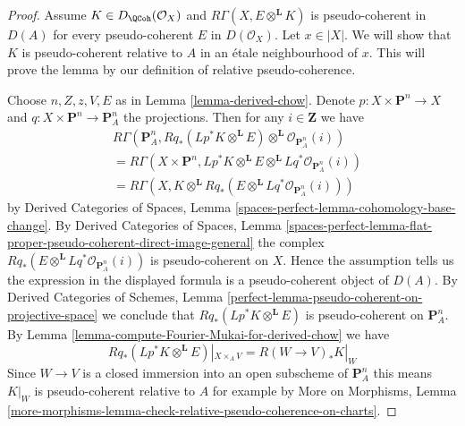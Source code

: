 \begin{proof}
Assume $K \in D_\QCoh(\mathcal{O}_X)$ and
$R\Gamma(X, E \otimes^\mathbf{L} K)$ is pseudo-coherent
in $D(A)$ for every pseudo-coherent $E$ in $D(\mathcal{O}_X)$.
Let $x \in |X|$. We will show that $K$ is pseudo-coherent relative to $A$
in an \'etale neighbourhood of $x$. This will prove the lemma
by our definition of relative pseudo-coherence.

\medskip\noindent
Choose $n, Z, z, V, E$ as in Lemma \ref{lemma-derived-chow}.
Denote $p : X \times \mathbf{P}^n \to X$ and
$q : X \times \mathbf{P}^n \to \mathbf{P}^n_A$
the projections.
Then for any $i \in \mathbf{Z}$ we have
\begin{align*}
& R\Gamma(\mathbf{P}^n_A,
Rq_*(Lp^*K \otimes^\mathbf{L} E)
\otimes^\mathbf{L}
\mathcal{O}_{\mathbf{P}^n_A}(i)) \\
& =
R\Gamma(X \times \mathbf{P}^n,
Lp^*K \otimes^\mathbf{L} E \otimes^\mathbf{L}
Lq^*\mathcal{O}_{\mathbf{P}^n_A}(i)) \\
& =
R\Gamma(X,
K \otimes^\mathbf{L} Rq_*(E \otimes^\mathbf{L}
Lq^*\mathcal{O}_{\mathbf{P}^n_A}(i)))
\end{align*}
by
Derived Categories of Spaces,
Lemma \ref{spaces-perfect-lemma-cohomology-base-change}.
By
Derived Categories of Spaces, Lemma
\ref{spaces-perfect-lemma-flat-proper-pseudo-coherent-direct-image-general}
the complex $Rq_*(E \otimes^\mathbf{L} Lq^*\mathcal{O}_{\mathbf{P}^n_A}(i))$
is pseudo-coherent on $X$. Hence the assumption tells us the expression
in the displayed formula is a pseudo-coherent object of $D(A)$.
By
Derived Categories of Schemes,
Lemma \ref{perfect-lemma-pseudo-coherent-on-projective-space}
we conclude that $Rq_*(Lp^*K \otimes^\mathbf{L} E)$ is
pseudo-coherent on $\mathbf{P}^n_A$.
By Lemma \ref{lemma-compute-Fourier-Mukai-for-derived-chow}
we have
$$
Rq_*(Lp^*K \otimes^\mathbf{L} E)|_{X \times_A V} =
R(W \to V)_*K|_W
$$
Since $W \to V$ is a closed immersion into an open subscheme of
$\mathbf{P}^n_A$ this means $K|_W$ is pseudo-coherent relative to $A$
for example by
More on Morphisms,
Lemma \ref{more-morphisms-lemma-check-relative-pseudo-coherence-on-charts}.
\end{proof}




















